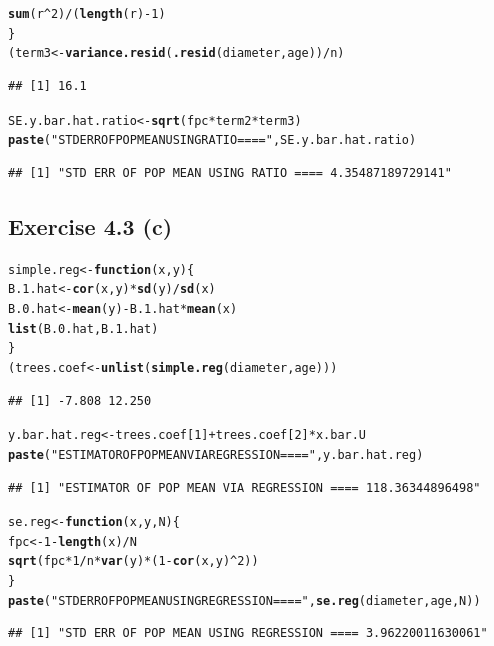 \documentclass{article}\usepackage{graphicx, color}
\makeatletter
\newcommand{\hlfunctioncall}[1]{\textcolor[rgb]{0.501960784313725,0,0.329411764705882}{\textbf{#1}}}%
\newcommand{\hlstring}[1]{\textcolor[rgb]{0.6,0.6,1}{#1}}%
\newenvironment{kframe}{%
 \def\at@end@of@kframe{}%
 \ifinner\ifhmode%
  \def\at@end@of@kframe{\end{minipage}}%
  \begin{minipage}{\columnwidth}%
 \fi\fi%
 \def\FrameCommand##1{\hskip\@totalleftmargin \hskip-\fboxsep
 \colorbox{shadecolor}{##1}\hskip-\fboxsep
     \hskip-\linewidth \hskip-\@totalleftmargin \hskip\columnwidth}%
 \MakeFramed {\advance\hsize-\width
   \@totalleftmargin\z@ \linewidth\hsize
   \@setminipage}}%
 {\par\unskip\endMakeFramed%
 \at@end@of@kframe}
\newenvironment{knitrout}{}{} %
\makeatother
\begin{document}
\begin{knitrout}
\begin{kframe}
\begin{alltt}
    \hlfunctioncall{sum}(r^2)/(\hlfunctioncall{length}(r) - 1)
\}
(term3 <- \hlfunctioncall{variance.resid}(\hlfunctioncall{.resid}(diameter, age))/n)
\end{alltt}
\begin{verbatim}
## [1] 16.1
\end{verbatim}
\begin{alltt}
SE.y.bar.hat.ratio <- \hlfunctioncall{sqrt}(fpc * term2 * term3)
\hlfunctioncall{paste}(\hlstring{"STD ERR OF POP MEAN USING RATIO ===="}, SE.y.bar.hat.ratio)
\end{alltt}
\begin{verbatim}
## [1] "STD ERR OF POP MEAN USING RATIO ==== 4.35487189729141"
\end{verbatim}
\end{kframe}
\end{knitrout}


\subsection*{Exercise 4.3 (c)}
\begin{knitrout}
\color{fgcolor}\begin{kframe}
\begin{alltt}
simple.reg <- \hlfunctioncall{function}(x, y) \{
    B.1.hat <- \hlfunctioncall{cor}(x, y) * \hlfunctioncall{sd}(y)/\hlfunctioncall{sd}(x)
    B.0.hat <- \hlfunctioncall{mean}(y) - B.1.hat * \hlfunctioncall{mean}(x)
    \hlfunctioncall{list}(B.0.hat, B.1.hat)
\}
(trees.coef <- \hlfunctioncall{unlist}(\hlfunctioncall{simple.reg}(diameter, age)))
\end{alltt}
\begin{verbatim}
## [1] -7.808 12.250
\end{verbatim}
\begin{alltt}
y.bar.hat.reg <- trees.coef[1] + trees.coef[2] * x.bar.U
\hlfunctioncall{paste}(\hlstring{"ESTIMATOR OF POP MEAN VIA REGRESSION ===="}, y.bar.hat.reg)
\end{alltt}
\begin{verbatim}
## [1] "ESTIMATOR OF POP MEAN VIA REGRESSION ==== 118.36344896498"
\end{verbatim}
\begin{alltt}
se.reg <- \hlfunctioncall{function}(x, y, N) \{
    fpc <- 1 - \hlfunctioncall{length}(x)/N
    \hlfunctioncall{sqrt}(fpc * 1/n * \hlfunctioncall{var}(y) * (1 - \hlfunctioncall{cor}(x, y)^2))
\}
\hlfunctioncall{paste}(\hlstring{"STD ERR OF POP MEAN USING REGRESSION ===="}, \hlfunctioncall{se.reg}(diameter, age, N))
\end{alltt}
\begin{verbatim}
## [1] "STD ERR OF POP MEAN USING REGRESSION ==== 3.96220011630061"
\end{verbatim}
\end{kframe}
\end{knitrout}
\end{document}
